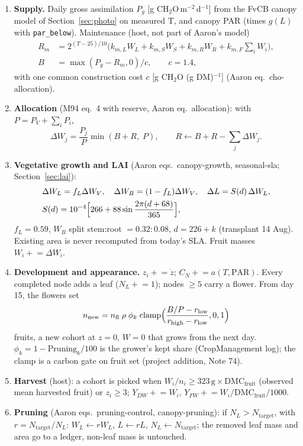 \documentclass[11pt,a4paper]{article}
\begin{document}
\begin{enumerate}[leftmargin=*]
\item \textbf{Supply.} Daily gross assimilation $P_g$ [g CH$_2$O\,m$^{-2}$\,d$^{-1}$] from the FvCB canopy model of
Section~\ref{sec:photo} on measured T,  and canopy PAR (times $g(L)$ with \texttt{par\_below}).
Maintenance (host, not part of Aaron's model)
\begin{equation}
\begin{aligned}
R_m&=2^{(T-25)/10}\bigl(k_{m,L}W_L+k_{m,S}W_S+k_{m,R}W_R+k_{m,F}\textstyle\sum_iW_i\bigr),\\
B&=\max(P_g-R_m,0)/c,\qquad c=1.4,
\end{aligned}
\end{equation}
with one common construction cost $c$ [g CH$_2$O (g DM)$^{-1}$] (Aaron eq.~cho-allocation).
\item \textbf{Allocation} (M94 eq.~4 with reserve, Aaron eq.~allocation): with $P=P_V+\sum_iP_i$,
\begin{equation}\label{eq:a-alloc}
\Delta W_j=\frac{P_j}{P}\min(B+R,\;P),\qquad R\leftarrow B+R-\textstyle\sum_j\Delta W_j .
\end{equation}
\item \textbf{Vegetative growth and LAI} (Aaron eqs.~canopy-growth, seasonal-sla; Section~\ref{sec:lai}):
\begin{equation}
\begin{aligned}
&\Delta W_L=f_L\Delta W_V,\quad \Delta W_B=(1-f_L)\Delta W_V,\quad \Delta L=S(d)\,\Delta W_L,\\
&S(d)=10^{-4}\Bigl[266+88\sin\frac{2\pi(d+68)}{365}\Bigr],
\end{aligned}
\end{equation}
$f_L=0.59$, $W_B$ split stem:root $=0.32:0.08$, $d=226+k$ (transplant 14 Aug). Existing area is never
recomputed from today's SLA. Fruit masses $W_i\mathrel{+}=\Delta W_i$.
\item \textbf{Development and appearance.} $z_i\mathrel{+}=\dot z$; $C_N\mathrel{+}=a(T,\mathrm{PAR})$. Every completed
node adds a leaf ($N_L\mathrel{+}=1$); nodes $\ge5$ carry a flower. From day 15, the flowers set
\begin{equation}\label{eq:a-set}
n_{\text{new}}=n_{\text{fl}}\;\rho\;\phi_k\;\mathrm{clamp}\Bigl(\frac{B/P-r_{\text{low}}}{r_{\text{high}}-r_{\text{low}}},0,1\Bigr)
\end{equation}
fruits, a new cohort at $z=0$, $W=0$ that grows from the next day. $\phi_k=1-\text{Pruning}_k/100$ is the grower's
kept share (CropManagement log); the clamp is a carbon gate on fruit set (project addition, Note 74).
\item \textbf{Harvest} (host): a cohort is picked when $W_i/n_i\ge323\,\text{g}\times\mathrm{DMC}_{\text{fruit}}$
(observed mean harvested fruit) or $z_i\ge3$; $Y_{DW}\mathrel{+}=W_i$, $Y_{FW}\mathrel{+}=W_i/\mathrm{DMC}_{\text{fruit}}/1000$.
\item \textbf{Pruning} (Aaron eqs.~pruning-control, canopy-pruning): if $N_L>N_{\text{target}}$, with
$r=N_{\text{target}}/N_L$: $W_L\leftarrow rW_L$, $L\leftarrow rL$, $N_L\leftarrow N_{\text{target}}$; the removed
leaf mass and area go to a ledger, non-leaf mass is untouched.
\end{enumerate}
\end{document}
